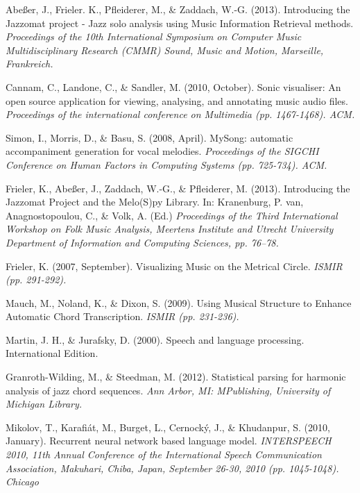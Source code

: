 \documentclass[bsc,singlespacing,parskip,deptreport]{infthesis}
\begin{document}
\begin{thebibliography}{9}
 Abeßer, J., Frieler. K., Pfleiderer, M., \& Zaddach, W.-G. (2013). Introducing the Jazzomat project - Jazz solo analysis using Music Information Retrieval methods. \emph{Proceedings of the 10th International Symposium on Computer Music Multidisciplinary Research (CMMR) Sound, Music and Motion, Marseille, Frankreich.}

Cannam, C., Landone, C., \& Sandler, M. (2010, October). Sonic visualiser: An open source application for viewing, analysing, and annotating music audio files. \emph{Proceedings of the international conference on Multimedia (pp. 1467-1468). ACM.}

Simon, I., Morris, D., \& Basu, S. (2008, April). MySong: automatic accompaniment generation for vocal melodies. \emph{Proceedings of the SIGCHI Conference on Human Factors in Computing Systems (pp. 725-734). ACM.}

Frieler, K., Abeßer, J., Zaddach, W.-G., \& Pfleiderer, M. (2013). Introducing the Jazzomat Project and the Melo(S)py Library. In: Kranenburg, P. van, Anagnostopoulou, C., \& Volk, A. (Ed.) \emph{Proceedings of the Third International Workshop on Folk Music Analysis, Meertens Institute and Utrecht University Department of Information and Computing Sciences, pp. 76–78.}

Frieler, K. (2007, September). Visualizing Music on the Metrical Circle. \emph{ISMIR (pp. 291-292).}

Mauch, M., Noland, K., \& Dixon, S. (2009). Using Musical Structure to Enhance Automatic Chord Transcription. \emph{ISMIR (pp. 231-236).}

Martin, J. H., \& Jurafsky, D. (2000). Speech and language processing. International Edition.

Granroth-Wilding, M., \& Steedman, M. (2012). Statistical parsing for harmonic analysis of jazz chord sequences. \emph{Ann Arbor, MI: MPublishing, University of Michigan Library.}

Mikolov, T., Karafiát, M., Burget, L., Cernocký, J., \& Khudanpur, S. (2010, January). Recurrent neural network based language model. \emph{INTERSPEECH 2010, 11th Annual Conference of the International Speech Communication Association, Makuhari, Chiba, Japan, September 26-30, 2010 (pp. 1045-1048).
Chicago}


\end{thebibliography}
\end{document}
